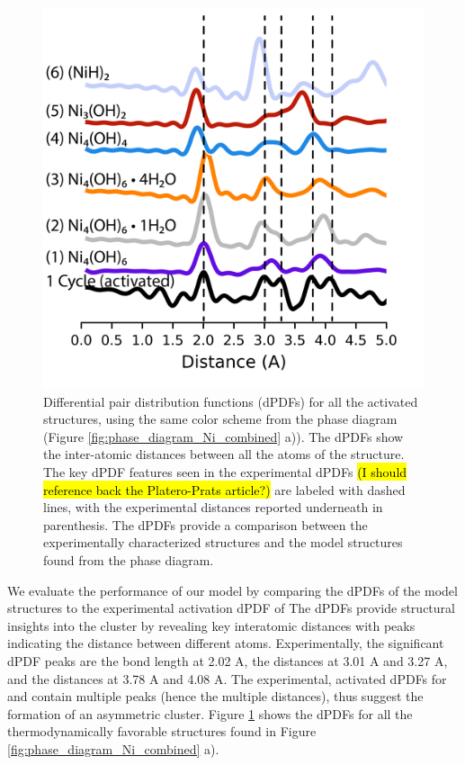 \documentclass[journal=jctcce,manuscript=article]{achemso}
\begin{document}
\begin{figure}[H]
    \centering
    \includegraphics{zi-images/01-Ni-Graphics/2021-03-02-Ni-trans-dPDFs-manuscript.png}
    \caption{Differential pair distribution functions (dPDFs) for all the activated structures, using the same color scheme from the  phase diagram (Figure \ref{fig:phase_diagram_Ni_combined} a)). The dPDFs show the inter-atomic distances between all the atoms of the structure. The key dPDF features seen in the experimental dPDFs \hl{(I should reference back the Platero-Prats article?)} are labeled with dashed lines, with the experimental distances reported underneath in parenthesis. The dPDFs provide a comparison between the experimentally characterized structures and the model structures found from the phase diagram.}
    \label{fig:dPDFs_TandP_trans_Ni}
\end{figure}

We evaluate the performance of our model by comparing the dPDFs of the model structures to the experimental activation dPDF of \citeauthor{PlateroPrats2017} The dPDFs provide structural insights into the cluster by revealing key interatomic distances with peaks indicating the distance between different atoms. Experimentally, the significant dPDF peaks are the  bond length at 2.02 A, the  distances at 3.01 A and 3.27 A, and the  distances at 3.78 A and 4.08 A. The experimental, activated dPDFs for  and  contain multiple peaks (hence the multiple distances), thus suggest the formation of an asymmetric cluster. Figure \ref{fig:dPDFs_TandP_trans_Ni} shows the dPDFs for all the thermodynamically favorable structures found in Figure \ref{fig:phase_diagram_Ni_combined} a). 
\end{document}
